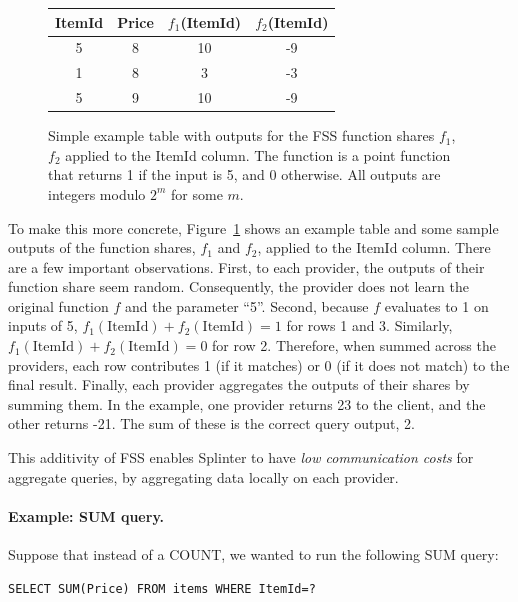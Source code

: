 \begin{figure}
	\centering
		\begin{tabular}{cccc}
			\toprule
			\bf ItemId & \bf Price & $f_1$(ItemId) & $f_2$(ItemId) \\
			\midrule
			5 & 8 & 10 & -9 \\
			1 & 8 & 3 & -3 \\
			5 & 9 & 10 & -9 \\
			\bottomrule
		\end{tabular}
	\caption[Function Secret Sharing example outputs.]{Simple example table with outputs for the FSS function shares $f_1$, $f_2$ applied to the ItemId column. 
		The function
		is a point function that returns 1 if the input is 5, and 0 otherwise.
		All outputs are integers modulo $2^m$ for some $m$.
	}
	\label{fig:fssExample2}
\end{figure}

To make this more concrete, Figure~\ref{fig:fssExample2} shows an example
table and some sample outputs of the function shares, $f_1$ and $f_2$,
applied to the ItemId column. 
There are a few important observations. First, to each provider,
the outputs of their function share seem random. Consequently, the provider does not learn
the original function $f$ and the parameter ``5''. Second, 
because $f$ evaluates 
to 1 on inputs of 5, $f_1(\mathrm{ItemId}) + f_2(\mathrm{ItemId}) = 1$ for rows 1 and 3. 
Similarly, $f_1(\mathrm{ItemId}) + f_2(\mathrm{ItemId})=0$ for row 2.
Therefore, when summed across the providers, each row
contributes 1 (if it matches) or 0 (if it does not match) to the 
final result. 
Finally, each provider aggregates the outputs of their shares by summing them. 
In the example, one provider returns 23 to the client, and
the other returns -21.
The sum of these is the correct query output, 2.

This additivity of FSS enables Splinter
to have \textit{low communication costs} for aggregate queries, by aggregating
data locally on each provider.

\paragraph{Example: SUM query.}
Suppose that instead of a COUNT, we wanted to run the following SUM query:
\begin{verbatim}
SELECT SUM(Price) FROM items WHERE ItemId=?
\end{verbatim}

